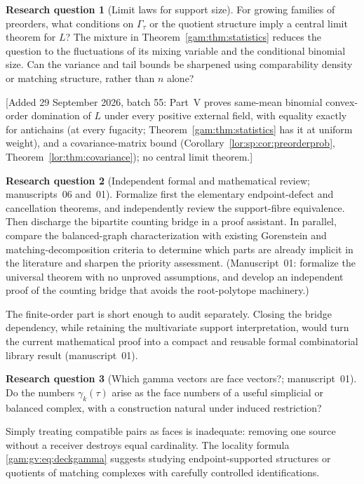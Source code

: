 \documentclass[11pt]{article}
\numberwithin{equation}{section}
\theoremstyle{definition}
\newtheorem{question}{Research question}%
\begin{document}
\begin{question}[Limit laws for support size]\label{lor:hq:limit}%
For growing families of preorders, what conditions on $\Gamma_\tau$ or the
quotient structure imply a central limit theorem for $L$? The mixture in
Theorem~\ref{gam:thm:statistics} reduces the question to the fluctuations of its
mixing variable and the conditional binomial size. Can the variance and
tail bounds be sharpened using comparability density or matching
structure, rather than $n$ alone?
\end{question}
[Added 29 September 2026, batch 55: Part~V proves same-mean binomial
convex-order domination of $L$ under every positive external field, with
equality exactly for antichains (at every fugacity;
Theorem~\ref{gam:thm:statistics} has it at uniform weight), and a
covariance-matrix bound (Corollary~\ref{lor:sp:cor:preorderprob},
Theorem~\ref{lor:thm:covariance}); no central limit theorem.]

\begin{question}[Independent formal and mathematical review; manuscripts~06 and~01]\label{gam:q:review}
Formalize first the elementary endpoint-defect and cancellation theorems,
and independently review the support-fibre equivalence. Then discharge the
bipartite counting bridge in a proof assistant. In parallel, compare the
balanced-graph characterization with existing Gorenstein and
matching-decomposition criteria to determine which parts are already
implicit in the literature and sharpen the priority assessment.
(Manuscript~01: formalize the universal theorem with no unproved
assumptions, and develop an independent proof of the counting bridge that
avoids the root-polytope machinery.)
\end{question}
The finite-order part is short enough to audit separately. Closing the
bridge dependency, while retaining the multivariate support interpretation,
would turn the current mathematical proof into a compact and reusable
formal combinatorial library result (manuscript~01).

\begin{question}[Which gamma vectors are face vectors?; manuscript~01]\label{gam:gv:q:faces}
Do the numbers $\gamma_k(\tau)$ arise as the face numbers of a useful simplicial
or balanced complex, with a construction natural under induced restriction?
\end{question}
Simply treating compatible pairs as faces is inadequate: removing one
source without a receiver destroys equal cardinality. The locality formula
\eqref{gam:gv:eq:deckgamma} suggests studying endpoint-supported structures or
quotients of matching complexes with carefully controlled identifications.
\end{document}
